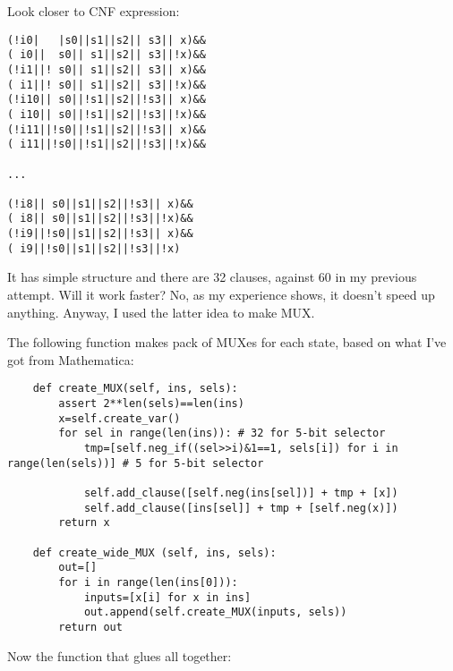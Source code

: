 Look closer to CNF expression:

\begin{lstlisting}
(!i0|   |s0||s1||s2|| s3|| x)&&
( i0||  s0|| s1||s2|| s3||!x)&&
(!i1||! s0|| s1||s2|| s3|| x)&&
( i1||! s0|| s1||s2|| s3||!x)&&
(!i10|| s0||!s1||s2||!s3|| x)&&
( i10|| s0||!s1||s2||!s3||!x)&&
(!i11||!s0||!s1||s2||!s3|| x)&&
( i11||!s0||!s1||s2||!s3||!x)&&

...

(!i8|| s0||s1||s2||!s3|| x)&&
( i8|| s0||s1||s2||!s3||!x)&&
(!i9||!s0||s1||s2||!s3|| x)&&
( i9||!s0||s1||s2||!s3||!x)
\end{lstlisting}

It has simple structure and there are 32 clauses, against 60 in my previous attempt.
Will it work faster?
No, as my experience shows, it doesn't speed up anything.
Anyway, I used the latter idea to make MUX.

The following function makes pack of MUXes for each state, based on what I've got from Mathematica:

\begin{lstlisting}
    def create_MUX(self, ins, sels):
        assert 2**len(sels)==len(ins)
        x=self.create_var()
        for sel in range(len(ins)): # 32 for 5-bit selector
            tmp=[self.neg_if((sel>>i)&1==1, sels[i]) for i in range(len(sels))] # 5 for 5-bit selector
    
            self.add_clause([self.neg(ins[sel])] + tmp + [x])
            self.add_clause([ins[sel]] + tmp + [self.neg(x)])
        return x
    
    def create_wide_MUX (self, ins, sels):
        out=[]
        for i in range(len(ins[0])):
            inputs=[x[i] for x in ins]
            out.append(self.create_MUX(inputs, sels))
        return out
\end{lstlisting}


Now the function that glues all together:

